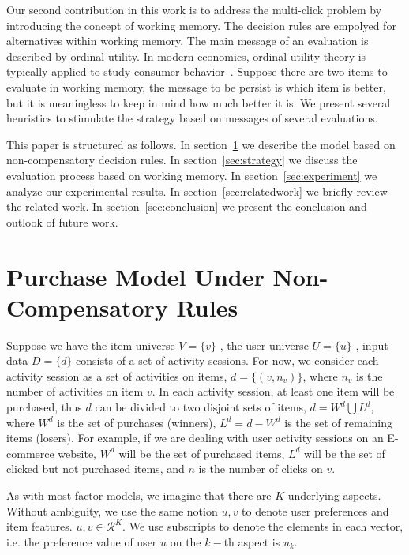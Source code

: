\documentclass[sigconf]{acmart}
\begin{document}
Our second contribution in this work is to address the multi-click problem by introducing the concept of working memory. The decision rules are empolyed for alternatives within working memory. The main message of an evaluation is described by ordinal utility. In modern economics, ordinal utility theory is typically applied to study consumer behavior~\cite{Simon1959Theories}. Suppose there are two items to evaluate in working memory, the message to be persist is which item is better, but it is meaningless to keep in mind how much better it is. We present several heuristics to stimulate the strategy based on messages of several evaluations.



This paper is structured as follows. In section~\ref{sec:model} we describe the model based on non-compensatory decision rules. In section~\ref{sec:strategy} we discuss the evaluation process based on working memory. In section~\ref{sec:experiment} we analyze our experimental results. In section~\ref{sec:relatedwork} we briefly review the related work. In section~\ref{sec:conclusion} we present the conclusion and outlook of future work.




\section{Purchase Model Under Non-Compensatory Rules}\label{sec:model}

Suppose we have the item universe $V=\{v\}$ , the user universe $U=\{u\}$ , input data $D=\{d\}$ consists of a set of activity sessions. For now, we consider each activity session as a set of activities on items, $d=\{(v,n_v)\}$, where $n_v$ is the number of activities on item $v$.  In each activity session, at least one item will be purchased, thus $d$ can be divided to two disjoint sets of items, $d=W^d\bigcup L^d$, where $W^d$ is the set of purchases (winners), $L^d=d-W^d$ is the set of remaining items (losers). For example, if we are dealing with user activity sessions on an E-commerce website, $W^d$ will be the set of purchased items, $L^d$ will be the set of clicked but not purchased items, and $n$ is the number of clicks on $v$.


As with most factor models, we imagine that there are $K$ underlying aspects.  Without ambiguity, we use the same notion $u,v$ to denote user preferences and item features. $u,v\in \mathcal{R}^K$. We use subscripts to denote the elements in each vector, i.e. the preference value of user $u$ on the $k-$th aspect is $u_k$. 
\end{document}
